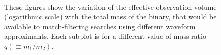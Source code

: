 \documentclass[aps,
prd,
amsmath,
amssymb,
twocolumn,
floatfix,
groupedaddress]{revtex4-1}
\def\l({\left(}
\def\r){\right)}
\begin{document}
\begin{figure}
\\ 
  \caption{These figures show the variation of the effective observation volume (logarithmic scale) with the total mass of the binary, that would be available to match-filtering searches using different waveform approximants. Each subplot is for a different value of mass ratio $q \l(\equiv m_1/m_2\r)$.}
  \label{fig:VeffsLog}
\end{figure}
\end{document}
